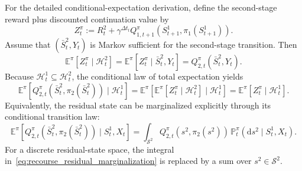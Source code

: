 For the detailed conditional-expectation derivation, define the second-stage reward plus discounted continuation value by
\begin{equation}Z_t^\pi:=R_t^2+\gamma^{\Delta t_t}Q_{1,t+1}^{\pi}\!\left(S_{t+1}^1,\pi_1(S_{t+1}^1)\right).\label{eq:recourse_continuation}\end{equation}
Assume that $(\bar S_t^2,Y_t)$ is Markov sufficient for the second-stage transition. Then
\begin{equation}\mathbb E^\pi\!\left[Z_t^\pi\mid\mathcal H_t^2\right]=\mathbb E^\pi\!\left[Z_t^\pi\mid\bar S_t^2,Y_t\right]=Q_{2,t}^{\pi}(\bar S_t^2,Y_t).\label{eq:stage2_markov_sufficiency}\end{equation}
Because $\mathcal H_t^1\subseteq\mathcal H_t^2$, the conditional law of total expectation yields
\begin{equation}\mathbb E^\pi\!\left[Q_{2,t}^{\pi}\!\left(\bar S_t^2,\pi_2(\bar S_t^2)\right)\mid\mathcal H_t^1\right]=\mathbb E^\pi\!\left[\mathbb E^\pi\!\left[Z_t^\pi\mid\mathcal H_t^2\right]\mid\mathcal H_t^1\right]=\mathbb E^\pi\!\left[Z_t^\pi\mid\mathcal H_t^1\right].\label{eq:recourse_conditional_total_expectation}\end{equation}
Equivalently, the residual state can be marginalized explicitly through its conditional transition law:
\begin{equation}\mathbb E^\pi\!\left[Q_{2,t}^{\pi}\!\left(\bar S_t^2,\pi_2(\bar S_t^2)\right)\mid S_t^1,X_t\right]=\int_{\mathcal S^2}Q_{2,t}^{\pi}\!\left(s^2,\pi_2(s^2)\right)\,\mathbb P_t^\pi\!\left(\mathrm d s^2\mid S_t^1,X_t\right).\label{eq:recourse_residual_marginalization}\end{equation}
For a discrete residual-state space, the integral in~\eqref{eq:recourse_residual_marginalization} is replaced by a sum over $s^2\in\mathcal S^2$.

